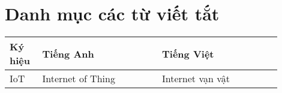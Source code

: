 \thispagestyle{plain}
\chapter*{Danh mục các từ viết tắt}
   \begin{longtable}{m{0.1\linewidth} m{0.4\linewidth} m{0.4\linewidth}}
      \hline 
       \textbf{Ký hiệu} & \textbf{Tiếng Anh} & \textbf{Tiếng Việt} \\ 
      \hline 
      IoT &	Internet of Thing & Internet vạn vật\\
      \hline 
\end{longtable}
